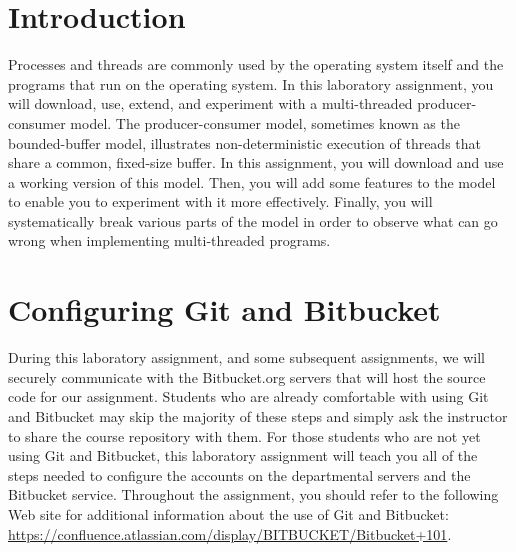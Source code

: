 

\usepackage[compact]{titlesec}



\section*{Introduction}

Processes and threads are commonly used by the operating system itself and the programs that run on the operating system.  In this
laboratory assignment, you will download, use, extend, and experiment with a multi-threaded producer-consumer model.  The
producer-consumer model, sometimes known as the bounded-buffer model, illustrates non-deterministic execution of threads that
share a common, fixed-size buffer.  In this assignment, you will download and use a working version of this model.  Then, you will
add some features to the model to enable you to experiment with it more effectively.  Finally, you will systematically break
various parts of the model in order to observe what can go wrong when implementing multi-threaded programs.

\section*{Configuring Git and Bitbucket}

During this laboratory assignment, and some subsequent assignments, we will securely communicate with the Bitbucket.org servers
that will host the source code for our assignment. Students who are already comfortable with using Git and Bitbucket may skip the
majority of these steps and simply ask the instructor to share the course repository with them.  For those students who are not
yet using Git and Bitbucket, this laboratory assignment will teach you all of the steps needed to configure the accounts on the
departmental servers and the Bitbucket service.  Throughout the assignment, you should refer to the following Web site for
additional information about the use of Git and Bitbucket: \url{https://confluence.atlassian.com/display/BITBUCKET/Bitbucket+101}.  

